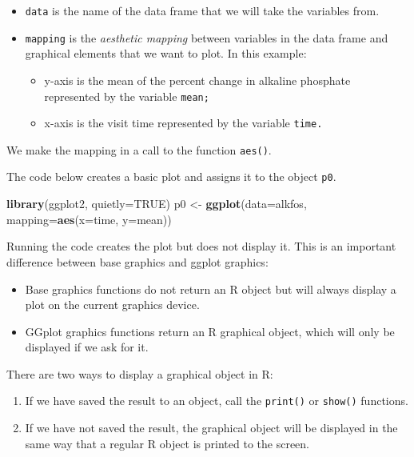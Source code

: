 \documentclass[
]{book}
\newenvironment{Shaded}{\begin{snugshade}}{\end{snugshade}}
\newcommand{\AttributeTok}[1]{\textcolor[rgb]{0.13,0.29,0.53}{#1}}
\newcommand{\ConstantTok}[1]{\textcolor[rgb]{0.56,0.35,0.01}{#1}}
\newcommand{\FunctionTok}[1]{\textcolor[rgb]{0.13,0.29,0.53}{\textbf{#1}}}
\newcommand{\NormalTok}[1]{#1}
\newcommand{\OtherTok}[1]{\textcolor[rgb]{0.56,0.35,0.01}{#1}}
\providecommand{\tightlist}{%
  \setlength{\itemsep}{0pt}\setlength{\parskip}{0pt}}
\begin{document}
\begin{itemize}
\tightlist
\item
  \texttt{data} is the name of the data frame that we will take the variables from.
\item
  \texttt{mapping} is the \emph{aesthetic mapping} between variables in the data frame and graphical elements that we want to plot. In this example:

  \begin{itemize}
  \tightlist
  \item
    y-axis is the mean of the percent change in alkaline phosphate represented by the variable \texttt{mean;}
  \item
    x-axis is the visit time represented by the variable \texttt{time.}
  \end{itemize}
\end{itemize}

We make the mapping in a call to the function \texttt{aes()}.

The code below creates a basic plot and assigns it to the object \texttt{p0}.

\begin{Shaded}
\begin{Highlighting}[]
\FunctionTok{library}\NormalTok{(ggplot2, }\AttributeTok{quietly=}\ConstantTok{TRUE}\NormalTok{)}
\NormalTok{p0 }\OtherTok{\textless{}{-}} \FunctionTok{ggplot}\NormalTok{(}\AttributeTok{data=}\NormalTok{alkfos, }\AttributeTok{mapping=}\FunctionTok{aes}\NormalTok{(}\AttributeTok{x=}\NormalTok{time, }\AttributeTok{y=}\NormalTok{mean))}
\end{Highlighting}
\end{Shaded}

Running the code creates the plot but does not display it. This is an important difference between base graphics and ggplot graphics:

\begin{itemize}
\tightlist
\item
  Base graphics functions do not return an R object but will always display a plot on the current graphics device.
\item
  GGplot graphics functions return an R graphical object, which will only be displayed if we ask for it.
\end{itemize}

There are two ways to display a graphical object in R:

\begin{enumerate}
\def\labelenumi{\arabic{enumi}.}
\tightlist
\item
  If we have saved the result to an object, call the \texttt{print()} or \texttt{show()} functions.
\item
  If we have not saved the result, the graphical object will be displayed in the same way that a regular R object is printed to the screen.
\end{enumerate}
\end{document}
